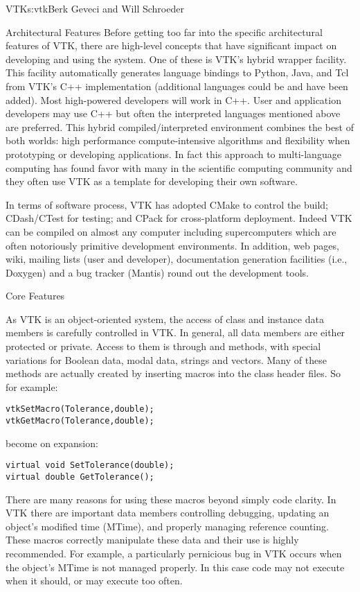 \begin{aosachapter}{VTK}{s:vtk}{Berk Geveci and Will Schroeder}
\begin{aosasect1}{Architectural Features}
Before getting too far into the specific architectural features of
VTK, there are high-level concepts that have significant impact on
developing and using the system. One of these is VTK's hybrid wrapper
facility. This facility automatically generates language bindings to
Python, Java, and Tcl from VTK's C++ implementation (additional
languages could be and have been added). Most high-powered developers
will work in C++. User and application developers may use C++ but
often the interpreted languages mentioned above are preferred. This
hybrid compiled/interpreted environment combines the best of both
worlds: high performance compute-intensive algorithms and flexibility
when prototyping or developing applications. In fact this approach to
multi-language computing has found favor with many in the scientific
computing community and they often use VTK as a template for
developing their own software.

In terms of software process, VTK has adopted CMake to control the
build; CDash/CTest for testing; and CPack for cross-platform
deployment. Indeed VTK can be compiled on almost any computer
including supercomputers which are often notoriously primitive
development environments. In addition, web pages, wiki, mailing lists
(user and developer), documentation generation facilities (i.e.,
Doxygen) and a bug tracker (Mantis) round out the development tools.

\begin{aosasect2}{Core Features}

As VTK is an object-oriented system, the access of class and instance
data members is carefully controlled in VTK\@. In general, all data
members are either protected or private. Access to them is through
 and  methods, with special variations for Boolean
data, modal data, strings and vectors. Many of these methods are
actually created by inserting macros into the class header files. So
for example:

\begin{verbatim}
vtkSetMacro(Tolerance,double);
vtkGetMacro(Tolerance,double);
\end{verbatim}

\noindent become on expansion:

\begin{verbatim}
virtual void SetTolerance(double);
virtual double GetTolerance();
\end{verbatim}

There are many reasons for using these macros beyond simply code
clarity. In VTK there are important data members controlling
debugging, updating an object's modified time (MTime), and properly
managing reference counting. These macros correctly manipulate these
data and their use is highly recommended. For example, a particularly
pernicious bug in VTK occurs when the object's MTime is not managed
properly. In this case code may not execute when it should, or may
execute too often.


\end{aosasect2}
\end{aosasect1}
\end{aosachapter}
